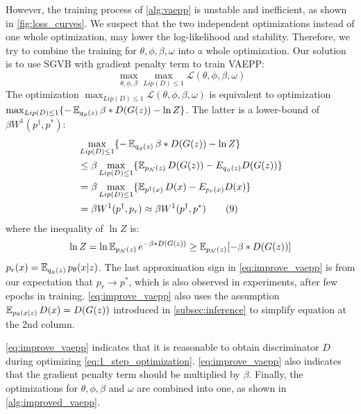 However, the training process of \cref{alg:vaepp} is unstable and inefficient, as shown in \cref{fig:loss_curves}. 
We suspect that the two independent optimizations instead of one whole optimization, may lower the log-likelihood and stability. Therefore, we try to combine the training for $\theta, \phi, \beta, \omega$ into a whole optimization. 
Our solution is to use SGVB with gradient penalty term to train VAEPP:
\begin{equation*}~\label{eq:1_step_optimization}
	\max_{\theta, \phi, \beta} \max_{Lip(D) \leq 1} \mathcal{L}(\theta, \phi, \beta, \omega) 
\end{equation*} 
The optimization $\max_{Lip(D) \leq 1} \mathcal{L}(\theta, \phi, \beta, \omega)$ is equivalent to optimization $\max_{Lip(D) \leq 1} \{ -\operatorname{\mathbb{E}}_{q_\phi(z)} \beta*D(G(z)) - \ln Z \}$. The latter is a lower-bound of $\beta W^1(p^\dag, p^*)$:
\begin{align*}\label{eq:improve_vaepp}
	&\max_{Lip(D) \leq 1} \{ -\operatorname{\mathbb{E}}_{q_\phi(z)} \beta*D(G(z)) - \ln Z \}\\ 
	&\leq \beta \max_{Lip(D) \leq 1} \{ \operatorname{\mathbb{E}}_{p_\mathcal{N}(z)} D(G(z)) - E_{q_\phi(z)} D(G(z)) \} \\
	&= \beta \max_{Lip(D) \leq 1} \{ \operatorname{\mathbb{E}}_{p^\dag(x)} D(x) - E_{p_r(x)} D(x) \} \\
	&= \beta W^1(p^\dag, p_r) \approx \beta W^1(p^\dag, p^*) \tag{9} 
\end{align*}
where the inequality of $\ln Z$ is:
\begin{equation*}
	\ln Z = \ln \operatorname{\mathbb{E}}_{p_\mathcal{N}(z)} e^{- \beta * D(G(z))} \geq \operatorname{\mathbb{E}}_{p_\mathcal{N}(z)} [- \beta * D(G(z))]
\end{equation*}
$p_r(x) = \operatorname{\mathbb{E}}_{q_\phi(z)} p_\theta(x|z)$. 
The last approximation sign in \cref{eq:improve_vaepp} is from our expectation that $p_r \rightarrow p^*$, which is also observed in experiments, after few epochs in training. \cref{eq:improve_vaepp} also uses the assumption $\operatorname{\mathbb{E}}_{p_\theta(x|z)} D(x) = D(G(z))$ introduced in \cref{subsec:inference} to simplify equation at the 2nd column. 

\cref{eq:improve_vaepp} indicates that it is reasonable to obtain  discriminator $D$ during optimizing \cref{eq:1_step_optimization}. \cref{eq:improve_vaepp} also indicates that the gradient penalty term should be multiplied by $\beta$. Finally, the optimizations for $\theta, \phi, \beta$ and $\omega$ are combined into one, as shown in \cref{alg:improved_vaepp}. 

